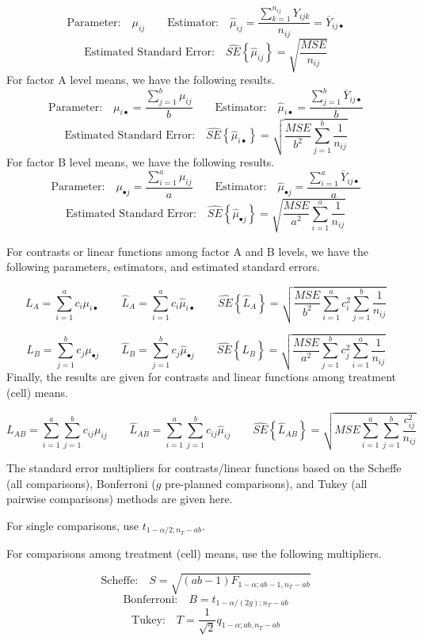 \documentclass[
]{book}
\begin{document}
\[ 
\mbox{Parameter:} \quad \mu_{ij} \qquad 
\mbox{Estimator:} \quad \hat{\mu}_{ij} = \frac{\sum_{k=1}^{n_{ij}}Y_{ijk}}{n_{ij}}=
\overline{Y}_{ij\bullet}
\] \[
\mbox{Estimated Standard Error:} \quad \hat{SE}\left\{\hat{\mu}_{ij}\right\}=\sqrt{\frac{MSE}{n_{ij}}}
\] For factor A level means, we have the following results. \[ 
\mbox{Parameter:} \quad \mu_{i\bullet} = \frac{\sum_{j=1}^b\mu_{ij}}{b} \qquad 
\mbox{Estimator:} \quad \hat{\mu}_{i\bullet} = 
\frac{\sum_{j=1}^b\overline{Y}_{ij\bullet}}{b} 
\] \[
\mbox{Estimated Standard Error:} \quad \hat{SE}\left\{\hat{\mu}_{i\bullet}\right\}=
\sqrt{\frac{MSE}{b^2}\sum_{j=1}^b\frac{1}{n_{ij}}}
\] For factor B level means, we have the following results. \[ 
\mbox{Parameter:} \quad \mu_{\bullet j} = \frac{\sum_{i=1}^a\mu_{ij}}{a} \qquad 
\mbox{Estimator:} \quad \hat{\mu}_{\bullet j} = 
\frac{\sum_{i=1}^a\overline{Y}_{ij\bullet}}{a} 
\] \[
\mbox{Estimated Standard Error:} \quad \hat{SE}\left\{\hat{\mu}_{\bullet j}\right\}=
\sqrt{\frac{MSE}{a^2}\sum_{i=1}^a\frac{1}{n_{ij}}}
\]

For contrasts or linear functions among factor A and B levels, we have
the following parameters, estimators, and estimated standard errors.

\[
L_A = \sum_{i=1}^a c_i\mu_{i\bullet} \qquad
\hat{L}_A = \sum_{i=1}^a c_i\hat{\mu}_{i\bullet} \qquad
\hat{SE}\left\{\hat{L}_A\right\} = \sqrt{\frac{MSE}{b^2}\sum_{i=1}^ac_i^2\sum_{j=1}^b\frac{1}{n_{ij}}}
\]

\[
L_B = \sum_{j=1}^b c_j\mu_{\bullet j} \qquad
\hat{L}_B = \sum_{j=1}^b c_j\hat{\mu}_{\bullet j} \qquad
\hat{SE}\left\{\hat{L}_B\right\} = \sqrt{\frac{MSE}{a^2}\sum_{j=1}^bc_j^2\sum_{i=1}^a\frac{1}{n_{ij}}}
\] Finally, the results are given for contrasts and linear functions
among treatment (cell) means.

\[
L_{AB} = \sum_{i=1}^a \sum_{j=1}^b c_{ij}\mu_{ij} \qquad
\hat{L}_{AB} = \sum_{i=1}^a\sum_{j=1}^b c_{ij}\hat{\mu}_{ij} \qquad
\hat{SE}\left\{\hat{L}_{AB}\right\} = \sqrt{MSE\sum_{i=1}^a\sum_{j=1}^b\frac{c_{ij}^2}{n_{ij}}}
\]

The standard error multipliers for contrasts/linear functions based on
the Scheffe (all comparisons), Bonferroni (\(g\) pre-planned
comparisons), and Tukey (all pairwise comparisons) methods are given
here.

For single comparisons, use \(t_{1-\alpha/2;n_T-ab}\).

For comparisons among treatment (cell) means, use the following
multipliers.

\[
\mbox{Scheffe:} \quad S=\sqrt{(ab-1)F_{1-\alpha;ab-1,n_T-ab}}
\] \[
\mbox{Bonferroni:} \quad B=t_{1-\alpha/(2g); n_T-ab}
\] \[
\mbox{Tukey:} \quad T=\frac{1}{\sqrt{2}}q_{1-\alpha;ab,n_T-ab}
\]
\end{document}
